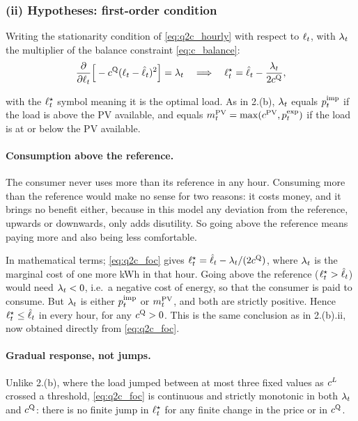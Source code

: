 \subsubsection{(ii) Hypotheses: first-order condition}

Writing the stationarity condition of \eqref{eq:q2c_hourly} with respect to $\ell_{t}$, with $\lambda_{t}$ the multiplier of the balance constraint \eqref{eq:c_balance}:
\begin{equation}
    \frac{\partial}{\partial \ell_{t}} \Big[ -c^{\mathrm{Q}} (\ell_{t} - \hat{\ell}_{t})^2 \Big] = \lambda_{t} 
    \quad\Longrightarrow\quad
    \ell_{t}^\star = \hat{\ell}_{t} - \frac{\lambda_{t}}{2 c^{\mathrm{Q}}},
    \label{eq:q2c_foc}
\end{equation}

with the $\ell_{t}^\star$ symbol meaning it is the optimal load. As in 2.(b), $\lambda_{t}$ equals $p^{\mathrm{imp}}_{t}$ if the load is above the PV available, and equals $m^{\mathrm{PV}}_{t} = \max(c^{\mathrm{PV}}, p^{\mathrm{exp}}_{t})$ if the load is at or below the PV available.

\paragraph{Consumption above the reference.}
The consumer never uses more than its reference in any hour. Consuming more than the reference would make no sense for two reasons: it costs money, and it brings no benefit either, because in this model any deviation from the reference, upwards or downwards, only adds disutility. So going above the reference means paying more and also being less comfortable.

In mathematical terms; \eqref{eq:q2c_foc} gives $\ell_{t}^\star = \hat{\ell}_{t} - \lambda_{t}/(2c^{\mathrm{Q}})$, where $\lambda_{t}$ is the marginal cost of one more kWh in that hour. Going above the reference ($\ell_{t}^\star > \hat{\ell}_{t}$) would need $\lambda_{t} < 0$, i.e.\ a negative cost of energy, so that the consumer is paid to consume. But $\lambda_{t}$ is either $p^{\mathrm{imp}}_{t}$ or $m^{\mathrm{PV}}_{t}$, and both are strictly positive. Hence $\ell_{t}^\star \leq \hat{\ell}_{t}$ in every hour, for any $c^{\mathrm{Q}} > 0$. This is the same conclusion as in 2.(b).ii, now obtained directly from \eqref{eq:q2c_foc}.

\paragraph{Gradual response, not jumps.}
Unlike 2.(b), where the load jumped between at most three fixed values as $c^{L}$ crossed a threshold, \eqref{eq:q2c_foc} is continuous and strictly monotonic in both $\lambda_{t}$ and $c^{\mathrm{Q}}$: there is no finite jump in $\ell_{t}^\star$ for any finite change in the price or in $c^{\mathrm{Q}}$. 

